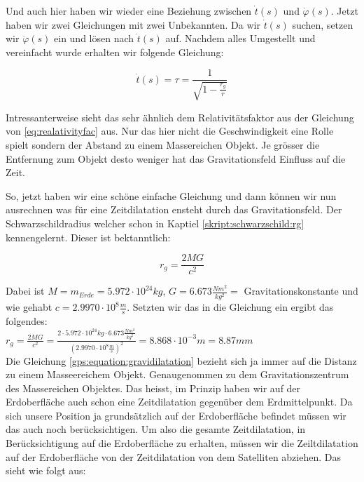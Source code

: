 \begin{refsection}
\noindent{}Und auch hier haben wir wieder eine Beziehung zwischen \( \dot t(s) \) und \( \dot \varphi(s) \). Jetzt haben wir zwei Gleichungen mit zwei Unbekannten. Da wir \( \dot t(s) \) suchen, setzen wir \( \dot \varphi(s) \) ein und lösen nach \( \dot t(s) \) auf. Nachdem alles Umgestellt und vereinfacht wurde erhalten wir folgende Gleichung:

\begin{equation}
\label{gps:equation:gravidilatation}
\dot t(s) = \tau = \frac{1}{\sqrt{1-\frac{r_g}{r}}}
\end{equation}

\noindent{}Intressanterweise sieht das sehr ähnlich dem Relativitätsfaktor aus der Gleichung von \ref{eq:realativityfac} aus. Nur das hier nicht die Geschwindigkeit eine Rolle spielt sondern der Abstand zu einem Massereichen Objekt. Je grösser die Entfernung zum Objekt desto weniger hat das Gravitationsfeld Einfluss auf die Zeit. 

So, jetzt haben wir eine schöne einfache Gleichung und dann können wir nun ausrechnen was für eine Zeitdilatation ensteht durch das Gravitationsfeld. Der Schwarzschildradius welcher schon in Kaptiel \ref{skript:schwarzschild:rg} kennengelernt. Dieser ist bektanntlich:

\begin{equation}
 r_g=\frac{2MG}{c^2}
\end{equation}

\noindent{}Dabei ist \( M = m_{Erde} = 5.972 \cdot 10^{24}kg \), \( G = 6.673 \frac{Nm^2}{kg^2} = \) Gravitationskonstante und wie gehabt \( c = 2.9970 \cdot 10^8 \frac{m}{s} \). Setzten wir das in die Gleichung ein ergibt das folgendes:\\

\( r_g=\frac{2MG}{c^2} = \frac{2 \cdot 5.972 \cdot 10^{24}kg \cdot  6.673 \frac{Nm^2}{kg^2}}{ (2.9970 \cdot 10^8 \frac{m}{s})^2} = 8.868 \cdot 10^{-3}m = 8.87mm\) \\

Die Gleichung \ref{gps:equation:gravidilatation} bezieht sich ja immer auf die Distanz zu einem Masseereichem Objekt. Genaugenommen zu dem Gravitationszentrum des Massereichen Objektes. Das heisst, im Prinzip haben wir auf der Erdoberfläche auch schon eine Zeitdilatation gegenüber dem Erdmittelpunkt. Da sich unsere Position ja grundsätzlich auf der Erdoberfläche befindet müssen wir das auch noch berücksichtigen. Um also die gesamte Zeitdilatation, in Berücksichtigung auf die Erdoberfläche zu erhalten, müssen wir die Zeiltdilatation auf der Erdoberfläche von der Zeitdilatation von dem Satelliten abziehen. Das sieht wie folgt aus: \\


\end{refsection}
